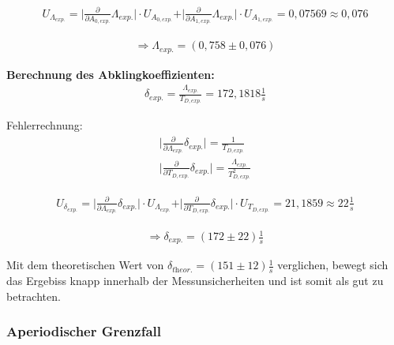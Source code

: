 \documentclass[a4paper]{scrartcl}
\numberwithin{equation}{subsection}
\begin{document}
\begin{align*}
U_{\Lambda_{\textit{exp.}}} = \vert \frac{\partial}{\partial A_{0,\textit{exp.}}}\Lambda_{\textit{exp.}}\vert \cdot U_{A_{0,\textit{exp.}}} + \vert \frac{\partial}{\partial A_{1,\textit{exp.}}}\Lambda_{\textit{exp.}}\vert \cdot U_{A_{1,\textit{exp.}}} = 0,07569 \approx 0,076 
\end{align*}

\begin{align*}
\Rightarrow \Lambda_{\textit{exp.}} = (0,758 \pm 0,076)
\end{align*}

\textbf{Berechnung des Abklingkoeffizienten:}
\begin{align}
\delta_{\textit{exp.}} = \frac{\Lambda_{\textit{exp.}}}{T_{D,\textit{exp.}}} = 172,1818 \frac{1}{s}
\end{align}

Fehlerrechnung:
\begin{align*}
\vert \frac{\partial}{\partial \Lambda_{\textit{exp.}}}\delta_{\textit{exp.}}\vert = \frac{1}{T_{D,\textit{exp.}}} \\
\vert \frac{\partial}{\partial T_{D,\textit{exp.}}}\delta_{\textit{exp.}}\vert = \frac{\Lambda_{\textit{exp.}}}{T_{D,\textit{exp.}}^2}
\end{align*}

\begin{align*}
U_{\delta_{\textit{exp.}}} = \vert \frac{\partial}{\partial \Lambda_{\textit{exp.}}}\delta_{\textit{exp.}}\vert \cdot U_{\Lambda_{\textit{exp.}}} + \vert \frac{\partial}{\partial T_{D,\textit{exp.}}}\delta_{\textit{exp.}}\vert \cdot U_{T_{D,\textit{exp.}}} = 21,1859 \approx 22 \frac{1}{s}
\end{align*}

\begin{align*}
\Rightarrow \delta_{\textit{exp.}} = (172 \pm 22) \frac{1}{s}
\end{align*}

Mit dem theoretischen Wert von $\delta_{\textit{theor.}} = (151 \pm 12) \frac{1}{s}$ verglichen, bewegt sich das Ergebiss knapp innerhalb der Messunsicherheiten und ist somit als gut zu betrachten.



\subsubsection{Aperiodischer Grenzfall}
\end{document}
